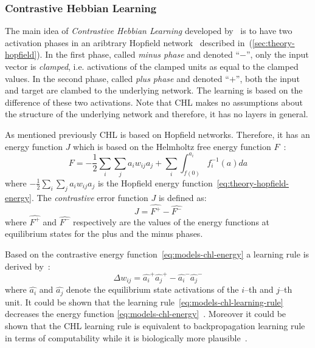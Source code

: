 
\subsubsection{Contrastive Hebbian Learning}
\label{sec:models-chl} 

The main idea of \emph{Contrastive Hebbian Learning} developed by~\citet{movellan1990contrastive} is to have two activation phases in an aribtrary Hopfield network~\citep{hopfield1984neurons} described in~(\ref{sec:theory-hopfield}). In the first phase, called \emph{minus phase} and denoted ``$-$'', only the input vector is \emph{clamped}, i.e. activations of the clamped units as equal to the clamped values. In the second phase, called \emph{plus phase} and denoted ``$+$'', both the input and target are clambed to the underlying network. The learning is based on the difference of these two activations. Note that CHL makes no assumptions about the structure of the underlying network and therefore, it has no layers in general. 

As mentioned previously CHL is based on Hopfield networks. Therefore, it has an energy function $J$ which is based on the Helmholtz free energy function $F$~\citep{hinton1989deterministic}:
\begin{equation}
  \label{eq:models-chl-helmholtz}
  F = -\frac{1}{2}\sum_i\sum_ja_iw_{ij}a_j + \sum_i \int_{f(0)}^{a_i} f_i^{-1}(a)da
\end{equation} 
where $-\frac{1}{2}\sum_i\sum_ja_iw_{ij}a_j$ is the Hopfield energy function~\ref{eq:theory-hopfield-energy}. The \emph{contrastive} error function $J$ is defined as: 
\begin{equation}
  \label{eq:models-chl-energy}
  J = \hat{F^{+}} - \hat{F^{-}}
\end{equation} 
where $\hat{F^{+}}$ and $\hat{F^{-}}$ respectively are the values of the energy functions at equilibrium states for the plus and the minus phases. 

Based on the contrastive energy function~\ref{eq:models-chl-energy} a learning rule is derived by~\citet{movellan1990contrastive}: 
\begin{equation}
  \label{eq:models-chl-learning-rule}
  \Delta w_{ij} = \hat{a_i}^{+}\hat{a_j}^{+} - \hat{a_i}^{-}\hat{a_j}^{-}
\end{equation}
where $\hat{a_i}$ and $\hat{a_j}$ denote the equilibrium state activations of the $i$--th and $j$--th unit. It could be shown that the learning rule~\ref{eq:models-chl-learning-rule} decreases the energy function \ref{eq:models-chl-energy}~\citep{movellan1990contrastive}. Moreover it could be shown that the CHL learning rule is equivalent to backpropagation learning rule in terms of computability while it is biologically more plausible~\citep{o1996bio, xie2003equivalence}. 

   
